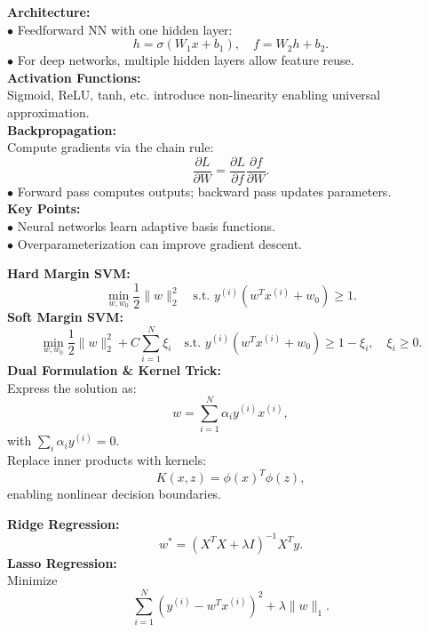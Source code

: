\documentclass[10pt]{article}
\begin{document}
\newpage
\footnotesize
\begin{multicols}{2}

\begin{tcolorbox}[title=Neural Networks]
\textbf{Architecture:}\\
\(\bullet\) Feedforward NN with one hidden layer: 
\[
h = \sigma(W_1 x + b_1),\quad f = W_2 h + b_2.
\]
\(\bullet\) For deep networks, multiple hidden layers allow feature reuse.\\[1mm]
\textbf{Activation Functions:}\\
Sigmoid, ReLU, tanh, etc. introduce non-linearity enabling universal approximation.\\[1mm]
\textbf{Backpropagation:}\\
Compute gradients via the chain rule:
\[
\frac{\partial L}{\partial W} = \frac{\partial L}{\partial f}\frac{\partial f}{\partial W}.
\]
\(\bullet\) Forward pass computes outputs; backward pass updates parameters.\\[1mm]
\textbf{Key Points:}\\
\(\bullet\) Neural networks learn adaptive basis functions.\\
\(\bullet\) Overparameterization can improve gradient descent.
\end{tcolorbox}

\begin{tcolorbox}[title=Support Vector Machines (SVMs)]
\textbf{Hard Margin SVM:}\\
\[
\min_{w,w_0} \frac{1}{2}\|w\|_2^2 \quad \text{s.t. } y^{(i)}(w^T x^{(i)}+w_0) \ge 1.
\]
\textbf{Soft Margin SVM:}\\
\[
\min_{w,w_0} \frac{1}{2}\|w\|_2^2 + C\sum_{i=1}^N \xi_i \quad \text{s.t. } y^{(i)}(w^T x^{(i)}+w_0) \ge 1-\xi_i,\quad \xi_i\ge0.
\]
\textbf{Dual Formulation \& Kernel Trick:}\\
Express the solution as:
\[
w = \sum_{i=1}^N \alpha_i y^{(i)} x^{(i)},
\]
with \(\sum_{i}\alpha_i y^{(i)}=0\).\\[1mm]
Replace inner products with kernels:
\[
K(x,z)=\phi(x)^T\phi(z),
\]
enabling nonlinear decision boundaries.
\end{tcolorbox}

\begin{tcolorbox}[title=Regularization]
\textbf{Ridge Regression:}\\
\[
w^*=(X^TX+\lambda I)^{-1}X^Ty.
\]
\textbf{Lasso Regression:}\\
Minimize
\[
\sum_{i=1}^N \left(y^{(i)}-w^T x^{(i)}\right)^2+\lambda\|w\|_1.
\]
\end{tcolorbox}

\end{multicols}
\end{document}
